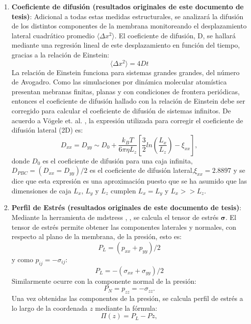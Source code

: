 \begin{enumerate}
\item \textbf{Coeficiente de difusi\'{o}n (resultados originales de este documento de tesis)}: 
Adicional a todas estas medidas estructurales, se analizar\'{a} la difusi\'{o}n de los distintos componentes de la membrana monitoreando el desplazamiento lateral cuadr\'{a}tico promedio $\langle\Delta x^2\rangle$. El coeficiente de difusi\'{o}n, D, se hallar\'{a} mediante una regresi\'{o}n lineal de este desplazamiento en funci\'{o}n del tiempo, gracias a la relaci\'{o}n de Einstein:
\begin{equation}\label{eq:diffei}
\langle\Delta x^2\rangle= 4Dt
 \end{equation}
 La relaci\'{o}n de Einstein funciona para sistemas grandes grandes, del n\'{u}mero de Avogadro. Como las simulaciones por din\'{a}mica molecular atom\'{i}stica presentan mebranas finitas, planas y con condiciones de frontera peri\'{o}dicas, entonces el coeficiente de difusi\'{o}n hallado con la relaci\'{o}n de Einstein debe ser corregido para calcular el coeficiente de difusi\'{o}n de sistemas infinitos. De acuerdo a V\"{o}gele et. al. \cite{Vogele2016DivergentMembranes}, la expresi\'{o}n utilizada para corregir el coeficiente de difusi\'{o}n lateral (2D) es:
\begin{equation}\label{eq:diffinf}
D_{xx}=D_{yy}\sim D_{0}+\frac{k_{B}T}{6\pi\eta L_{z}}\left [\frac{3}{2}ln\left (\frac{L_x}{L_z}\right )-\xi_{xx}\right ],
\end{equation}
donde $D_{0}$ es el coeficiente de difusi\'{o}n para una caja infinita, $D_{PBC}=\left (D_{xx}=D_{yy}\right )/2$ es el coeficiente de difusi\'{o}n lateral,$\xi_{xx}=2.8897$ y se dice que esta expresi\'{o}n es una aproximaci\'{o}n puesto que se ha asumido que las dimensiones de caja $L_x$, $L_y$ y $L_z$ cumplen $L_x=L_y$ y $L_x>>L_z$.\\
\item \textbf{Perfil de Estr\'{e}s (resultados originales de este documento de tesis)}: Mediante la herramienta de mdstress \cite{Vanegas2020MdStress.org}, \cite{Vanegas2014ImportanceSimulations}, se calcula el tensor de estr\'{e}s $\mathbf{\sigma}$. El tensor de estr\'{e}s permite obtener las componentes laterales y normales, con respecto al plano de la membrana, de la presi\'{o}n, esto es:
\begin{equation}
    P_{L}=\left(p_{xx}+p_{yy}\right)/2
\end{equation}
y como $p_{ij}=-\sigma_{ij}$:
\begin{equation}
    P_{L}=-\left(\sigma_{xx}+\sigma_{yy}\right)/2
\end{equation}
Similarmente ocurre con la componente normal de la presi\'{o}n:
\begin{equation}
    P_{N}=p_{zz}=-\sigma_{zz}.
\end{equation}
Una vez obtenidas las componentes de la presi\'{o}n, se calcula perfil de estr\'{e}s a lo largo de la coordenada $z$ mediante la f\'{o}rmula:
\begin{equation}
    \Pi(z)=P_{L}-P{z},
\end{equation}
\end{enumerate}
